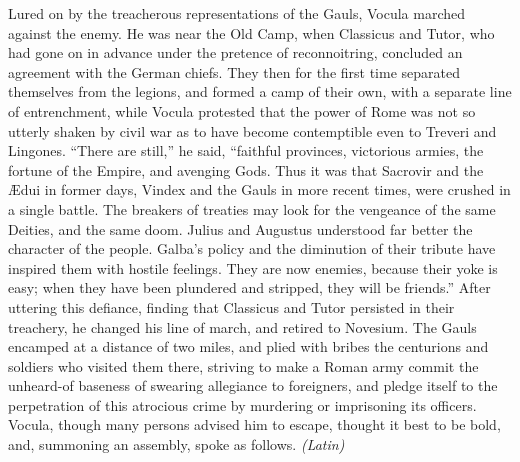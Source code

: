 Lured on by the treacherous representations of the Gauls, Vocula marched against the enemy. He was near the Old Camp, when Classicus and Tutor, who had gone on in advance under the pretence of reconnoitring, concluded an agreement with the German chiefs. They then for the first time separated themselves from the legions, and formed a camp of their own, with a separate line of entrenchment, while Vocula protested that the power of Rome was not so utterly shaken by civil war as to have become contemptible even to Treveri and Lingones. ``There are still,'' he said, ``faithful provinces, victorious armies, the fortune of the Empire, and avenging Gods. Thus it was that Sacrovir and the Ædui in former days, Vindex and the Gauls in more recent times, were crushed in a single battle. The breakers of treaties may look for the vengeance of the same Deities, and the same doom. Julius and Augustus understood far better the character of the people. Galba's policy and the diminution of their tribute have inspired them with hostile feelings. They are now enemies, because their yoke is easy; when they have been plundered and stripped, they will be friends.'' After uttering this defiance, finding that Classicus and Tutor persisted in their treachery, he changed his line of march, and retired to Novesium. The Gauls encamped at a distance of two miles, and plied with bribes the centurions and soldiers who visited them there, striving to make a Roman army commit the unheard-of baseness of swearing allegiance to foreigners, and pledge itself to the perpetration of this atrocious crime by murdering or imprisoning its officers. Vocula, though many persons advised him to escape, thought it best to be bold, and, summoning an assembly, spoke as follows. \emph{(Latin)}


